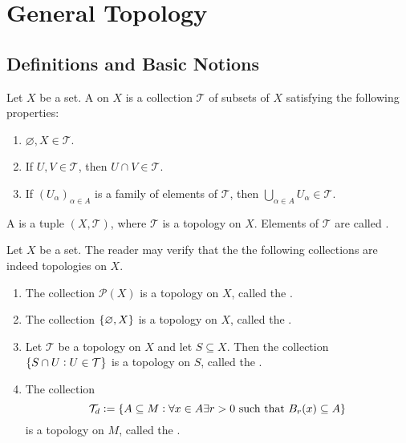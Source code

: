 \chapter{General Topology}
\section{Definitions and Basic Notions}
\begin{definition}
	Let $X$ be a set. A  on $X$ is a collection $\mathcal{T}$ of subsets of $X$ satisfying the following properties:
	\begin{enumerate}
		\item $\varnothing, X \in \mathcal{T}$.
		\item If $U,V \in \mathcal{T}$, then $U \cap V \in \mathcal{T}$.
		\item If $(U_\alpha)_{\alpha \in A}$ is a family of elements of $\mathcal{T}$, then $\bigcup_{\alpha \in A} U_\alpha \in \mathcal{T}$.	
	\end{enumerate}

	A  is a tuple $(X,\mathcal{T})$, where $\mathcal{T}$ is a topology on $X$. Elements of $\mathcal{T}$ are called . 
\end{definition}

\begin{example}[Topologies]
	Let $X$ be a set. The reader may verify that the the following collections are indeed topologies on $X$.
	\begin{enumerate}[label = \textup{(}\alph*\textup{)}]
		\item The collection $\mathcal{P}(X)$ is a topology on $X$, called the .			
		\item The collection $\cbr[0]{\varnothing,X}$ is a topology on $X$, called the .
		\item Let $\mathcal{T}$ be a topology on $X$ and let $S \subseteq X$. Then the collection $\cbr[0]{S \cap U : U \in \mathcal{T}}$ is a topology on $S$, called the .
		\item The collection
			\begin{equation}
				\mathcal{T}_d := \cbr[0]{A \subseteq M :  \forall x \in A \exists r > 0 \text{ such that } B_r(x) \subseteq A}
			\end{equation}
			\noindent is a topology on $M$, called the .
	\end{enumerate}
\end{example}

